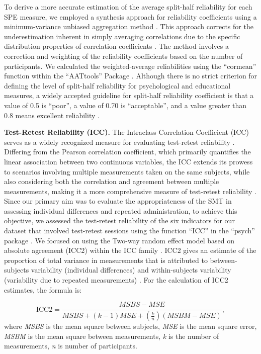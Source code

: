 \documentclass[sn-apa]{sn-jnl}%
\theoremstyle{thmstyleone}%
\theoremstyle{thmstyletwo}%
\theoremstyle{thmstylethree}%
\begin{document}
To derive a more accurate estimation of the average split-half reliability for each SPE measure, we employed a synthesis approach for reliability coefficients using a minimum-variance unbiased aggregation method \parencite{alexander1990note,olkin1958unbiased}. This approach corrects for the underestimation inherent in simply averaging correlations due to the specific distribution properties of correlation coefficients \parencite{shieh2010estimation}. The method involves a correction and weighting of the reliability coefficients based on the number of participants. We calculated the weighted-average reliabilities using the ``cormean” function within the ``AATtools” Package \parencite{kahveci2020aattools}. Although there is no strict criterion for defining the level of split-half reliability for psychological and educational measures, a widely accepted guideline for split-half reliability coefficient is that a value of 0.5 is “poor”, a value of 0.70 is “acceptable”, and a value greater than 0.8 means excellent reliability \parencite{cicchetti1981developing}.  

\textbf{Test-Retest Reliability (ICC).} The Intraclass Correlation Coefficient (ICC) serves as a widely recognized measure for evaluating test-retest reliability \parencite{fisher1992statistical}. Differing from the Pearson correlation coefficient, which primarily quantifies the linear association between two continuous variables, the ICC extends its prowess to scenarios involving multiple measurements taken on the same subjects, while also considering both the correlation and agreement between multiple measurements, making it a more comprehensive measure of test-retest reliability \parencite{koo2016a}. 
Since our primary aim was to evaluate the appropriateness of the SMT in assessing individual differences and repeated administration, to achieve this objective, we assessed the test-retest reliability of the six indicators for our dataset that involved test-retest sessions using the function ``ICC” in the “psych” package \parencite{revelle2017psych}. We focused on using the Two-way random effect model based on absolute agreement (ICC2) within the ICC family \parencite{chen2018intraclass,xu2023rex,koo2016a}. ICC2 gives an estimate of the proportion of total variance in measurements that is attributed to between-subjects variability (individual differences) and within-subjects variability (variability due to repeated measurements) \parencite{xu2023rex}. For the calculation of ICC2 estimates, the formula is:

\begin{equation}
	\text{ICC2}=\frac{M S B S-M S E}{M S B S+(k-1) M S E+\left(\frac{k}{n}\right)(M S B M-M S E)},
\end{equation}
where \textit{MSBS} is the mean square between subjects, \textit{MSE} is the mean square error, \textit{MSBM} is the mean square between measurements, \textit{k} is the number of measurements, \textit{n} is number of participants. 
\end{document}

